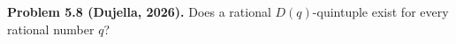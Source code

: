 \textbf{Problem 5.8 (Dujella, 2026).} Does a rational $D(q)$-quintuple exist for every rational number $q$?
